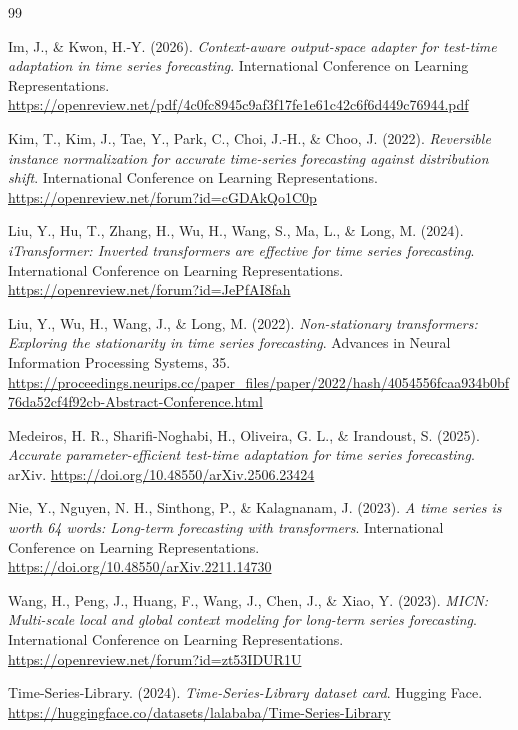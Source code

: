 \documentclass[10pt]{article}
\begin{document}
\begin{thebibliography}{99}

Im, J., \& Kwon, H.-Y. (2026).
\textit{Context-aware output-space adapter for test-time adaptation in time series forecasting}.
International Conference on Learning Representations.
\url{https://openreview.net/pdf/4c0fc8945c9af3f17fe1e61c42c6f6d449c76944.pdf}

Kim, T., Kim, J., Tae, Y., Park, C., Choi, J.-H., \& Choo, J. (2022).
\textit{Reversible instance normalization for accurate time-series forecasting against distribution shift}.
International Conference on Learning Representations.
\url{https://openreview.net/forum?id=cGDAkQo1C0p}

Liu, Y., Hu, T., Zhang, H., Wu, H., Wang, S., Ma, L., \& Long, M. (2024).
\textit{iTransformer: Inverted transformers are effective for time series forecasting}.
International Conference on Learning Representations.
\url{https://openreview.net/forum?id=JePfAI8fah}

Liu, Y., Wu, H., Wang, J., \& Long, M. (2022).
\textit{Non-stationary transformers: Exploring the stationarity in time series forecasting}.
Advances in Neural Information Processing Systems, 35.
\url{https://proceedings.neurips.cc/paper_files/paper/2022/hash/4054556fcaa934b0bf76da52cf4f92cb-Abstract-Conference.html}

Medeiros, H. R., Sharifi-Noghabi, H., Oliveira, G. L., \& Irandoust, S. (2025).
\textit{Accurate parameter-efficient test-time adaptation for time series forecasting}.
arXiv.
\url{https://doi.org/10.48550/arXiv.2506.23424}

Nie, Y., Nguyen, N. H., Sinthong, P., \& Kalagnanam, J. (2023).
\textit{A time series is worth 64 words: Long-term forecasting with transformers}.
International Conference on Learning Representations.
\url{https://doi.org/10.48550/arXiv.2211.14730}

Wang, H., Peng, J., Huang, F., Wang, J., Chen, J., \& Xiao, Y. (2023).
\textit{MICN: Multi-scale local and global context modeling for long-term series forecasting}.
International Conference on Learning Representations.
\url{https://openreview.net/forum?id=zt53IDUR1U}

Time-Series-Library. (2024).
\textit{Time-Series-Library dataset card}.
Hugging Face.
\url{https://huggingface.co/datasets/lalababa/Time-Series-Library}


\end{thebibliography}
\end{document}
